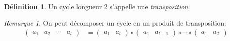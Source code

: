 \documentclass{report}
\theoremstyle{definition}
\newtheorem*{defin}{D\'efinition}
\theoremstyle{remark}
\newtheorem*{rema}{Remarque}
\begin{document}
	\begin{defin}
		Un cycle longueur 2 s'appelle une \emph{transposition}.
	\end{defin}
	\begin{rema}
		On peut d\'ecomposer un cycle en un produit de transposition:
		\begin{align*}
			\begin{pmatrix}
				a_1&a_2&\dotsb&a_l
			\end{pmatrix}&= \begin{pmatrix}
				a_1&a_l
			\end{pmatrix} \circ \begin{pmatrix}
				a_1&a_{l-1}
			\end{pmatrix} \circ \dotsb \circ \begin{pmatrix}
				a_1&a_2
			\end{pmatrix}
		\end{align*}
	\end{rema}
\end{document}
